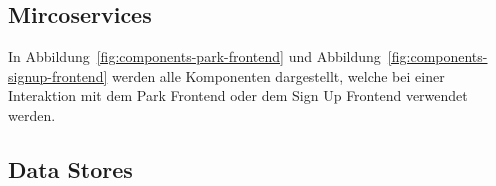\subsection{Mircoservices}

In Abbildung~\ref{fig:components-park-frontend} und Abbildung~\ref{fig:components-signup-frontend} werden alle Komponenten dargestellt, welche bei einer Interaktion mit dem Park Frontend oder dem Sign Up Frontend verwendet werden.
\subsection{Data Stores}